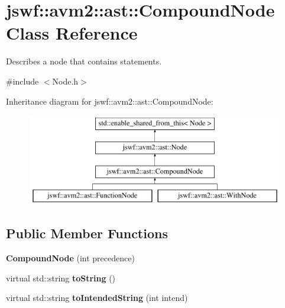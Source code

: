 \hypertarget{classjswf_1_1avm2_1_1ast_1_1_compound_node}{\section{jswf\+:\+:avm2\+:\+:ast\+:\+:Compound\+Node Class Reference}
\label{classjswf_1_1avm2_1_1ast_1_1_compound_node}
}


Describes a node that contains statements.  




{\ttfamily \#include $<$Node.\+h$>$}

Inheritance diagram for jswf\+:\+:avm2\+:\+:ast\+:\+:Compound\+Node\+:\begin{figure}[H]
\begin{center}
\leavevmode
\includegraphics[height=4.000000cm]{classjswf_1_1avm2_1_1ast_1_1_compound_node}
\end{center}
\end{figure}
\subsection*{Public Member Functions}
\begin{DoxyCompactItemize}
\item 
\hypertarget{classjswf_1_1avm2_1_1ast_1_1_compound_node_a56af26ef9ff88b908db9f29e3b43bfea}{{\bfseries Compound\+Node} (int precedence)}\label{classjswf_1_1avm2_1_1ast_1_1_compound_node_a56af26ef9ff88b908db9f29e3b43bfea}

\item 
\hypertarget{classjswf_1_1avm2_1_1ast_1_1_compound_node_a0770f297a6c0058d9923076afae0ac27}{virtual std\+::string {\bfseries to\+String} ()}\label{classjswf_1_1avm2_1_1ast_1_1_compound_node_a0770f297a6c0058d9923076afae0ac27}

\item 
\hypertarget{classjswf_1_1avm2_1_1ast_1_1_compound_node_a76c1416f875841088773d18f2ecbffa9}{virtual std\+::string {\bfseries to\+Intended\+String} (int intend)}\label{classjswf_1_1avm2_1_1ast_1_1_compound_node_a76c1416f875841088773d18f2ecbffa9}

\end{DoxyCompactItemize}
